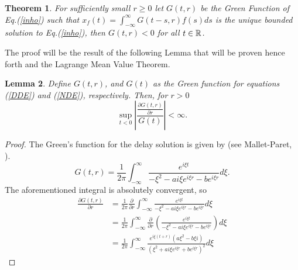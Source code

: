\documentclass[12pt,letterpaper]{amsart}
\newtheorem{theorem}{Theorem}[section]
\newtheorem{lemma}[theorem]{Lemma}
\theoremstyle{definition}
\theoremstyle{remark}
\numberwithin{equation}{section}
\begin{document}
\begin{theorem}\label{the 1}
For sufficiently small $r\ge 0$ let $G(t,r)$ be the Green Function of Eq.(\ref{inho}) such that
$x_f(t)=\int_{-\infty}^{\infty}G(t-s,r)f(s)ds$ is the unique bounded solution to Eq.(\ref{inho}), then $G(t,r)<0$ for all $t\in\mathbb R$. 
\end{theorem}
The proof will be the result of the following Lemma that will be proven hence forth and the Lagrange Mean Value Theorem.
\begin{lemma}\label{lem1}
Define $G(t,r)$, and $G(t)$ as the Green function for equations (\ref{DDE}) and (\ref{NDE}), respectively. Then, for $r>0$ 
\[\sup_{t<0}\left|\frac{\frac{\partial G(t,r)}{\partial r}}{G(t)}\right|< \infty.\]
\end{lemma}
\begin{proof}

\medskip
The Green's function for the delay solution is given by (see Mallet-Paret, \cite{mal,pru}).
\[G(t,r)=\frac{1}{2\pi}\int_{-\infty}^{\infty}\frac{e^{i\xi t}}{-\xi^2-ai\xi e^{i\xi r}-be^{i\xi r}}d\xi.\]
The aforementioned integral is absolutely convergent, so
\begin{align}
 \frac{\partial G(t,r)}{\partial r} &=\frac{1}{2\pi}\frac{\partial}{\partial r}  \int_{-\infty}^{\infty} \frac{e^{i\xi t}}{-\xi^2-ai\xi e^{i\xi r}-be^{i\xi r}}d\xi 
 \nonumber\\
 &=\frac{1}{2\pi}  \int_{-\infty}^{\infty}\frac{\partial}{\partial r} \left(\frac{e^{i\xi t}}{-\xi^2-ai\xi e^{i\xi r}-be^{i\xi r}}\right)d\xi \nonumber \\
  &= \frac{1}{2\pi}  \int_{-\infty}^{\infty} \frac{e^{i\xi (t+r)}\left(a\xi^2-b\xi i\right)}{\left(\xi^2+ai\xi e^{i\xi r}+be^{i\xi r}\right)^2} d\xi  \label{2.1}
 \end{align}


\end{proof}
\end{document}
